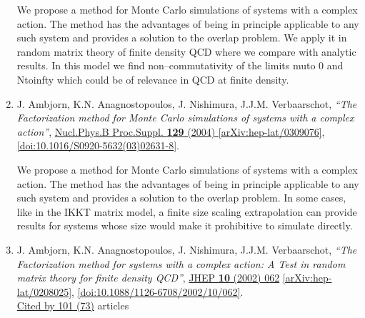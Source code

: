 \documentclass[a4paper,10pt]{article}
\begin{document}
\begin{enumerate}
We propose a method for Monte Carlo simulations of systems with a complex action. The method has the advantages of being in principle applicable to any such system and provides a solution to the overlap problem. We apply it in random matrix theory of finite density QCD where we compare with analytic results. In this model we find non--commutativity of the limits muto 0 and Ntoinfty which could be of relevance in QCD at finite density.
\item J. Ambjorn, K.N. Anagnostopoulos, J. Nishimura, J.J.M. Verbaarschot, {\it ``The Factorization method for Monte Carlo simulations of systems with a complex action''}, \href{https://www.doi.org/10.1016/S0920-5632(03)02631-8}{Nucl.Phys.B Proc.Suppl. {\bf 129} (2004) } \href{https://arxiv.org/abs/hep-lat/0309076}{[arXiv:hep-lat/0309076]}, \href{https://www.doi.org/10.1016/S0920-5632(03)02631-8}{[doi:10.1016/S0920-5632(03)02631-8]}.

We propose a method for Monte Carlo simulations of systems with a complex action. The method has the advantages of being in principle applicable to any such system and provides a solution to the overlap problem. In some cases, like in the IKKT matrix model, a finite size scaling extrapolation can provide results for systems whose size would make it prohibitive to simulate directly.
\item J. Ambjorn, K.N. Anagnostopoulos, J. Nishimura, J.J.M. Verbaarschot, {\it ``The Factorization method for systems with a complex action: A Test in random matrix theory for finite density QCD''}, \href{https://www.doi.org/10.1088/1126-6708/2002/10/062}{JHEP {\bf 10} (2002) 062} \href{https://arxiv.org/abs/hep-lat/0208025}{[arXiv:hep-lat/0208025]}, \href{https://www.doi.org/10.1088/1126-6708/2002/10/062}{[doi:10.1088/1126-6708/2002/10/062]}.
\\\href{https://inspirehep.net/literature/?q=refersto%3Arecid%3A593052}{Cited by 101 (73)} articles


\end{enumerate}
\end{document}
